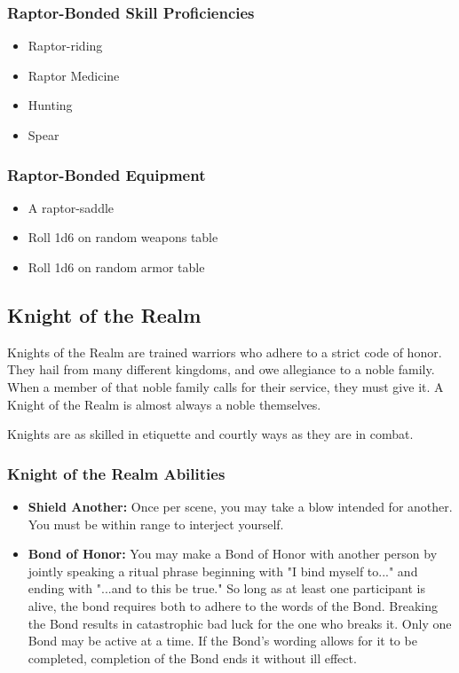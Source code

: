 \begin{multicols}{2}
\subsubsection{Raptor-Bonded Skill Proficiencies}

\begin{itemize}
  \item Raptor-riding
  \item Raptor Medicine
  \item Hunting
  \item Spear
\end{itemize}

\subsubsection{Raptor-Bonded Equipment}

\begin{itemize}
  \item A raptor-saddle
  \item Roll 1d6 on random weapons table
  \item Roll 1d6 on random armor table
\end{itemize}

\subsection{Knight of the Realm}

Knights of the Realm are trained warriors who adhere to a strict code of
honor. They hail from many different kingdoms, and owe allegiance to a
noble family. When a member of that noble family calls for their service,
they must give it. A Knight of the Realm is almost always a noble themselves.

Knights are as skilled in etiquette and courtly ways as they are in combat.

\subsubsection{Knight of the Realm Abilities}

\begin{itemize}
  \item \textbf{Shield Another:} Once per scene, you may take a blow
    intended for another. You must be within range to interject yourself.
  \item \textbf{Bond of Honor:} You may make a Bond of Honor with another
    person by jointly speaking a ritual phrase beginning with "I bind myself
    to..." and ending with "...and to this be true." So long as at least one
    participant is alive, the bond requires both to adhere to the words of
    the Bond. Breaking the Bond results in catastrophic bad luck for the
    one who breaks it. Only one Bond may be active at a time. If the Bond's
    wording allows for it to be completed, completion of the Bond ends it
    without ill effect.
\end{itemize}


\end{multicols}
